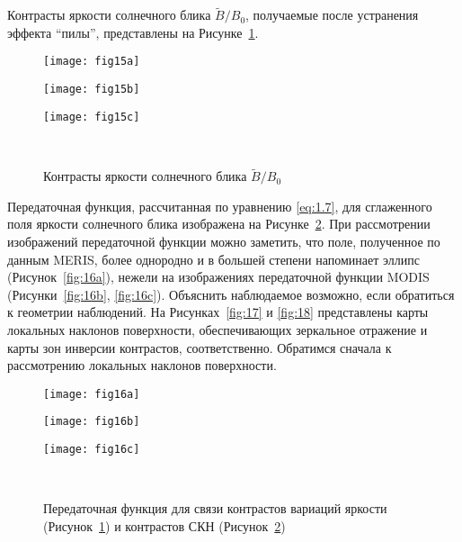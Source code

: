 Контрасты яркости солнечного блика $\tilde{B}/B_{0}$, получаемые после устранения эффекта ``пилы'', представлены на Рисунке~\ref{fig:15}.



\begin{figure}[H]
    	\centering
	\begin{minipage}{.31\textwidth}
	    \subcaptionbox{\label{fig:15a}}
		{\texttt{[image: fig15a]}}
	\end{minipage}
	\hfill
	\begin{minipage}{.31\textwidth}
	    \subcaptionbox{\label{fig:15b}}
		{\texttt{[image: fig15b]}}
	\end{minipage}
	\hfill
	\begin{minipage}{.31\textwidth}
	    \subcaptionbox{\label{fig:15c}}
		{\texttt{[image: fig15c]}}
	\end{minipage}
	\\
    \caption{Контрасты яркости солнечного блика $\tilde{B}/B_{0}$}
    \label{fig:15}
\end{figure}



Передаточная функция, рассчитанная по уравнению \eqref{eq:1.7}, для сглаженного поля яркости солнечного блика изображена на Рисунке~\ref{fig:16}. При рассмотрении изображений передаточной функции можно заметить, что поле, полученное по данным MERIS, более однородно и в большей степени напоминает эллипс (Рисунок~\ref{fig:16a}), нежели на изображениях передаточной функции MODIS (Рисунки~\ref{fig:16b}, \ref{fig:16c}). Объяснить наблюдаемое возможно, если обратиться к геометрии наблюдений. На Рисунках~\ref{fig:17} и \ref{fig:18} представлены карты локальных наклонов поверхности, обеспечивающих зеркальное отражение и карты зон инверсии контрастов, соответственно. Обратимся сначала к рассмотрению локальных наклонов поверхности.


\begin{figure}[H]
    	\centering
	\begin{minipage}{.33\textwidth}
	    \subcaptionbox{\label{fig:16a}}
		{\texttt{[image: fig16a]}}
	\end{minipage}
	\hfill
	\begin{minipage}{.31\textwidth}
	    \subcaptionbox{\label{fig:16b}}
		{\texttt{[image: fig16b]}}
	\end{minipage}
	\hfill
	\begin{minipage}{.31\textwidth}
	    \subcaptionbox{\label{fig:16c}}
		{\texttt{[image: fig16c]}}
	\end{minipage}
	\\
    \caption{Передаточная функция  для связи контрастов вариаций яркости (Рисунок~\ref{fig:15}) и контрастов СКН (Рисунок~\ref{fig:16})}
    \label{fig:16}
\end{figure}




